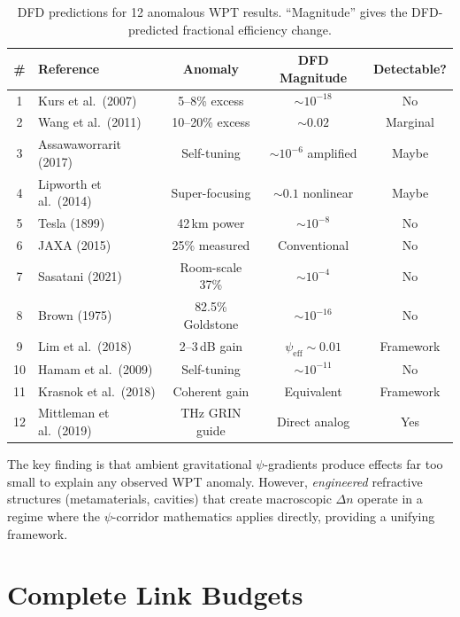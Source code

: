 \documentclass[journal,twocolumn]{IEEEtran}
\begin{document}
\begin{table}[t]
\caption{DFD predictions for 12 anomalous WPT results. ``Magnitude'' gives the DFD-predicted fractional efficiency change.}
\label{tab:literature}
\centering
\small
\begin{tabular}{clccc}
\toprule
\# & Reference & Anomaly & DFD Magnitude & Detectable? \\
\midrule
1 & Kurs et al.\ (2007) & 5--8\% excess & $\sim 10^{-18}$ & No \\
2 & Wang et al.\ (2011) & 10--20\% excess & $\sim 0.02$ & Marginal \\
3 & Assawaworrarit (2017) & Self-tuning & $\sim 10^{-6}$ amplified & Maybe \\
4 & Lipworth et al.\ (2014) & Super-focusing & $\sim 0.1$ nonlinear & Maybe \\
5 & Tesla (1899) & 42\,km power & $\sim 10^{-8}$ & No \\
6 & JAXA (2015) & 25\% measured & Conventional & No \\
7 & Sasatani (2021) & Room-scale 37\% & $\sim 10^{-4}$ & No \\
8 & Brown (1975) & 82.5\% Goldstone & $\sim 10^{-16}$ & No \\
9 & Lim et al.\ (2018) & 2--3\,dB gain & $\psi_\text{eff} \sim 0.01$ & Framework \\
10 & Hamam et al.\ (2009) & Self-tuning & $\sim 10^{-11}$ & No \\
11 & Krasnok et al.\ (2018) & Coherent gain & Equivalent & Framework \\
12 & Mittleman et al.\ (2019) & THz GRIN guide & Direct analog & Yes \\
\bottomrule
\end{tabular}
\end{table}

The key finding is that ambient gravitational $\psi$-gradients produce
effects far too small to explain any observed WPT anomaly. However,
\emph{engineered} refractive structures (metamaterials, cavities)
that create macroscopic $\Delta n$ operate in a regime where the
$\psi$-corridor mathematics applies directly, providing a unifying
framework.

\section{Complete Link Budgets}\label{sec:link_budgets}
\end{document}
